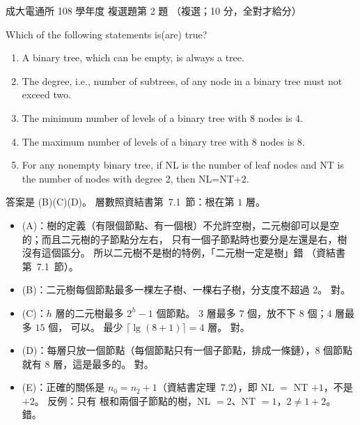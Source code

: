 \begin{pastexam}[label={px:ncku-108-comm-ds-02}]{成大電通所 108 學年度 複選題第 2 題}
（複選；10 分，全對才給分）

Which of the following statements is(are) true?
\begin{enumerate}[label=(\Alph*)]
\item A binary tree, which can be empty, is always a tree.
\item The degree, i.e., number of subtrees, of any node in a binary tree must not exceed two.
\item The minimum number of levels of a binary tree with 8 nodes is 4.
\item The maximum number of levels of a binary tree with 8 nodes is 8.
\item For any nonempty binary tree, if NL is the number of leaf nodes and NT is the number of nodes with
degree 2, then NL=NT+2.
\end{enumerate}
\end{pastexam}

\begin{pastsoln}
答案是 (B)(C)(D)。 層數照資結書第~7.1~節：根在第 $1$ 層。
\begin{itemize}
\item (A)：樹的定義（有限個節點、有一個根）不允許空樹，二元樹卻可以是空的；而且二元樹的子節點分左右，
只有一個子節點時也要分是左還是右，樹沒有這個區分。 所以二元樹不是樹的特例，「二元樹一定是樹」錯
（資結書第~7.1~節）。
\item (B)：二元樹每個節點最多一棵左子樹、一棵右子樹，分支度不超過 $2$。 對。
\item (C)：$h$ 層的二元樹最多 $2^h - 1$ 個節點。 $3$ 層最多 $7$ 個，放不下 $8$ 個；$4$ 層最多 $15$ 個，
可以。 最少 $\lceil \lg (8 + 1) \rceil = 4$ 層。 對。
\item (D)：每層只放一個節點（每個節點只有一個子節點，排成一條鏈），$8$ 個節點就有 $8$ 層，這是最多的。
對。
\item (E)：正確的關係是 $n_0 = n_2 + 1$（資結書定理~7.2），即 NL $=$ NT $+ 1$，不是 $+ 2$。 反例：只有
根和兩個子節點的樹，NL $= 2$、NT $= 1$，$2 \ne 1 + 2$。 錯。
\end{itemize}
\end{pastsoln}
